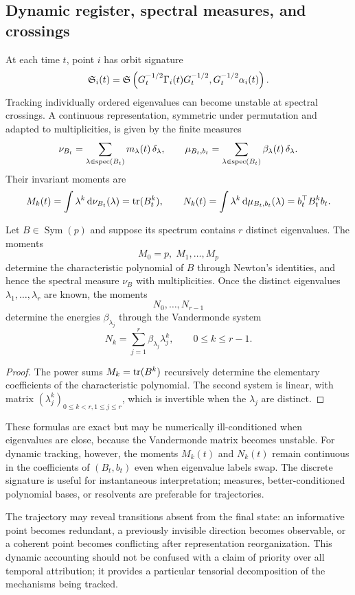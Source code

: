 \subsection{Dynamic register, spectral measures, and crossings}
At each time $t$, point $i$ has orbit signature
\begin{equation}
\mathfrak S_i(t)=\mathfrak S\left(G_t^{-1/2}\Gamma_i(t)G_t^{-1/2},
G_t^{-1/2}\alpha_i(t)\right).
\end{equation}
Tracking individually ordered eigenvalues can become unstable at spectral crossings. A continuous representation, symmetric under permutation and adapted to multiplicities, is given by the finite measures
\begin{equation}
\nu_{B_t}=\sum_{\lambda\in\operatorname{spec}(B_t)}m_\lambda(t)\,\delta_\lambda,
\qquad
\mu_{B_t,b_t}=\sum_{\lambda\in\operatorname{spec}(B_t)}\beta_\lambda(t)\,\delta_\lambda.
\label{eq:spectral-measures}
\end{equation}
Their invariant moments are
\begin{equation}
M_k(t)=\int \lambda^k\,\mathrm d\nu_{B_t}(\lambda)=\operatorname{tr}(B_t^k),
\qquad
N_k(t)=\int \lambda^k\,\mathrm d\mu_{B_t,b_t}(\lambda)=b_t^\top B_t^k b_t.
\label{eq:spectral-moments}
\end{equation}
\begin{proposition}
Let $B\in\operatorname{Sym}(p)$ and suppose its spectrum contains $r$ distinct eigenvalues. The moments
\[
M_0=p,\;M_1,\ldots,M_p
\]
determine the characteristic polynomial of $B$ through Newton's identities, and hence the spectral measure $\nu_B$ with multiplicities. Once the distinct eigenvalues $\lambda_1,\ldots,\lambda_r$ are known, the moments
\[
N_0,\ldots,N_{r-1}
\]
determine the energies $\beta_{\lambda_j}$ through the Vandermonde system
\[
N_k=\sum_{j=1}^r\beta_{\lambda_j}\lambda_j^k,
\qquad 0\le k\le r-1.
\]
\end{proposition}
\begin{proof}
The power sums $M_k=\operatorname{tr}(B^k)$ recursively determine the elementary coefficients of the characteristic polynomial. The second system is linear, with matrix $(\lambda_j^k)_{0\le k<r,1\le j\le r}$, which is invertible when the $\lambda_j$ are distinct.
\end{proof}
These formulas are exact but may be numerically ill-conditioned when eigenvalues are close, because the Vandermonde matrix becomes unstable. For dynamic tracking, however, the moments $M_k(t)$ and $N_k(t)$ remain continuous in the coefficients of $(B_t,b_t)$ even when eigenvalue labels swap. The discrete signature is useful for instantaneous interpretation; measures, better-conditioned polynomial bases, or resolvents are preferable for trajectories.

The trajectory may reveal transitions absent from the final state: an informative point becomes redundant, a previously invisible direction becomes observable, or a coherent point becomes conflicting after representation reorganization. This dynamic accounting should not be confused with a claim of priority over all temporal attribution; it provides a particular tensorial decomposition of the mechanisms being tracked.

